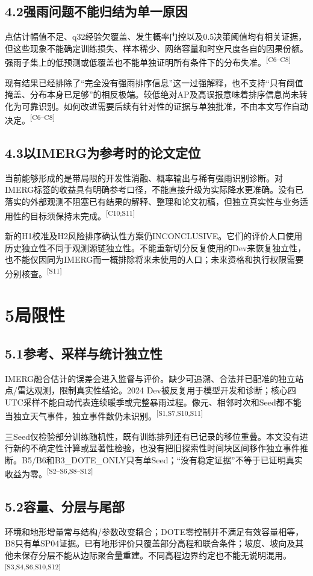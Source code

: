 \documentclass[UTF8,10.5pt,a4paper,fontset=none]{ctexart}
\newcommand{\evi}[1]{\textsuperscript{\textcolor{muted}{[#1]}}}
\newcommand{\nextpart}[1]{\clearpage\section*{#1}}
\begin{document}
\subsection*{4.2\quad 强雨问题不能归结为单一原因}
点估计幅值不足、q32经验欠覆盖、发生概率门控以及0.5决策阈值均有相关证据，但这些现象不能确定训练损失、样本稀少、网络容量和时空尺度各自的因果份额。强雨子集上的低预测或低覆盖也不能单独证明所有条件下的分布失准。\evi{C6--C8}

现有结果已经排除了“完全没有强雨排序信息”这一过强解释，也不支持“只有阈值掩盖、分布本身已足够”的相反极端。较低绝对AP及高误报意味着排序信息尚未转化为可靠识别。如何改进需要后续有针对性的证据与单独批准，不由本文写作自动决定。\evi{C6--C8}

\subsection*{4.3\quad 以IMERG为参考时的论文定位}
当前能够形成的是带局限的开发性消融、概率输出与稀有强雨识别诊断。对IMERG标签的收益具有明确参考口径，不能直接升级为实际降水更准确。没有已落实的外部观测不阻塞已有结果的解释、整理和论文初稿，但独立真实性与业务适用性的目标须保持未完成。\evi{C10;S11}

新的H1校准及H2风险排序确认性方案仍INCONCLUSIVE。它们的评价人口使用历史独立性不同于观测源链独立性。不能重新切分反复使用的Dev来恢复独立性，也不能仅因同为IMERG而一概排除将来未使用的人口；未来资格和执行权限需要分别核查。\evi{S11}

\nextpart{5\quad 局限性}
\subsection*{5.1\quad 参考、采样与统计独立性}
IMERG融合估计的误差会进入监督与评价。缺少可追溯、合法并已配准的独立站点/雷达观测，限制真实性结论。2024 Dev被反复用于模型开发和诊断；核心四UTC采样不能自动代表连续暖季或完整暴雨过程。像元、相邻时次和Seed都不能当独立天气事件，独立事件数仍未识别。\evi{S1,S7,S10,S11}

三Seed仅检验部分训练随机性，既有训练排列还有已记录的移位重叠。本文没有进行新的不确定性计算或显著性检验，也没有把旧探索性时间块区间移作独立事件推断。B5/B6和B3\_DOTE\_ONLY只有单Seed；“没有稳定证据”不等于已证明真实收益为零。\evi{S2--S6,S8--S12}

\subsection*{5.2\quad 容量、分层与尾部}
环境和地形增量常与结构/参数改变耦合；DOTE零控制并不满足有效容量相等，B8只有单SP04证据。已有地形评价只覆盖部分高程和联合条件；坡度、坡向及其他未保存分层不能从边际聚合量重建。不同高程边界约定也不能无说明混用。\evi{S3,S4,S6,S10,S12}
\end{document}
